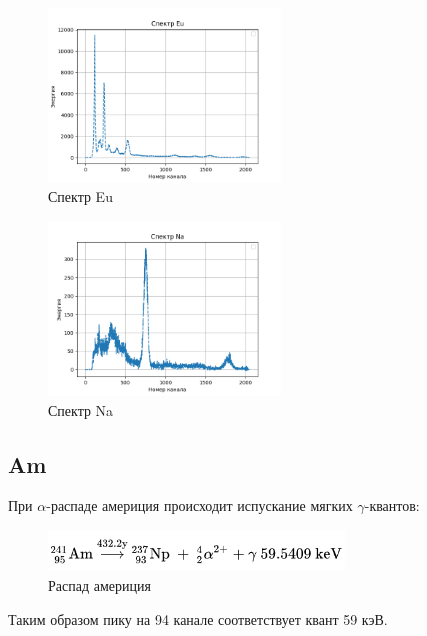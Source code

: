 \documentclass[a4paper,12pt]{article} %
\begin{document}
		\begin{figure}[h!]
      \includegraphics[width=0.55\textwidth]{img/Eu.png}
      \centering
      \caption{Спектр Eu}
    \end{figure}\par
		\begin{figure}[h!]
      \includegraphics[width=0.55\textwidth]{img/Na.png}
      \centering
      \caption{Спектр Na}
    \end{figure}\par
	\newpage
		\subsection*{Am}
			При $\alpha$-распаде америция происходит испускание мягких $\gamma$-квантов:
			\begin{figure}[h!]
				\includegraphics[width=0.7\textwidth]{img/Am-alpha.png}
				\centering
				\caption{Распад америция}
			\end{figure}\par
			Таким образом пику на 94 канале соответствует квант 59 кэВ.
		
\end{document}
